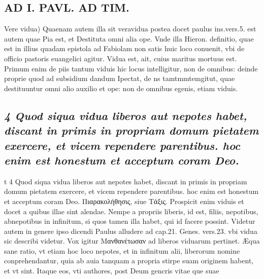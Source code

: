 \documentclass{article}
\begin{document}
\begin{pages}
\section*{AD I. PAVL. AD TIM. }
\marginpar{[ p.254 ]}\pstart Vere vidua) Quaenam autem illa sit veravidua postea docet paulus ins.vers.5. est autem quae Pia est, et Destituta omni alia ope. Vnde illa Hieron. definitio, quae est in illius quadam epistola ad Fabiolam non satis huic loco conuenit, vbi de officio pastoris euangelici agitur. Vidua est, ait, cuius maritus mortuus est. Primum enim de piis tantum viduis hic locus intelligitur, non de omnibus: deinde proprie quod ad subsidium dandum Ipectat, de ns tamtmmtemgitut, quae destituuntur omni alio auxilio et ope: non de omnibus egenis, etiam viduis.  \pend\pstart {}
{}
\subsection*{\textit{4 Quod siqua vidua liberos aut nepotes habet, discant in primis in propriam domum pietatem exercere, et vicem rependere parentibus. hoc enim est honestum et acceptum coram Deo.}}t 4 Quod siqua vidua liberos aut nepotes habet, discant in primis in propriam domum pietatem exercere, et vicem rependere parentibus. hoc enim est honestum et acceptum coram Deo.  \pend\pstart Πιαρακολήθησις, siue Τάξις. Prospicit enim viduis et docet a quibus illae sint alendae. Nempe a propriis liberis, id est, filiis, nepotibus, abnepotibus in infinitum, si quos tamen illa habet, qui id facere possint. Videtur autem in genere ipso dicendi Paulus alludere ad cap.21. Genes. vers.23. vbi vidua sic describi videtur. Vox igitur Μανθανέτωσαν ad liberos viduarum pertinet. Æqua sane ratio, vt etiam hoc loco nepotes, et in infinitum alii, liberorum nomine conprehendantur, quia ab auia tanquam a propria stirpe suam originem habent, et vt sint. Itaque eos, vti authores, post Deum gencris vitae que suae  \pend

\end{pages}
\end{document}
